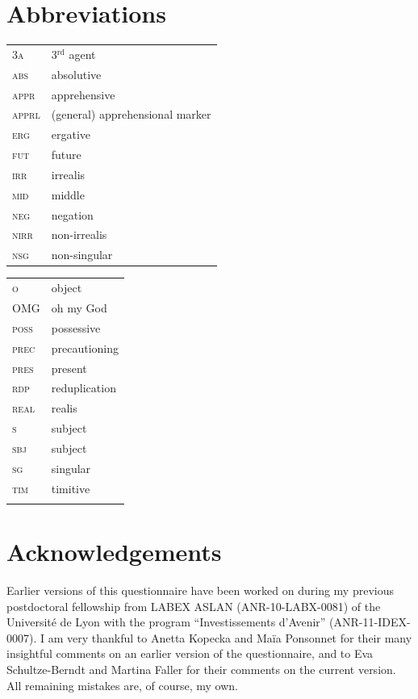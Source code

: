 \documentclass[output=paper,colorlinks,citecolor=brown]{langscibook}
\begin{document}
\section*{Abbreviations}
\begin{tabularx}{.5\textwidth}{@{}lQ@{}}
\textsc{3a} & 3$\mathrm{^{rd}}$ agent \\
\textsc{abs} & absolutive \\
\textsc{appr} & apprehensive \\
\textsc{apprl} & (general) apprehensional marker \\
\textsc{erg} & ergative \\
\textsc{fut} & future \\
\textsc{irr} & irrealis \\
\textsc{mid} & middle \\
\textsc{neg} & negation \\
\textsc{nirr} & non-irrealis \\
\textsc{nsg} & non-singular \end{tabularx}%
\begin{tabularx}{.5\textwidth}{@{}lQ@{}}
\textsc{o} & object \\
\textsc{OMG} & oh my God \\
\textsc{poss} & possessive \\
\textsc{prec} & precautioning \\
\textsc{pres} & present \\
\textsc{rdp} & reduplication \\
\textsc{real} & realis \\
\textsc{s} & subject \\
\textsc{sbj} & subject \\
\textsc{sg} & singular \\
\textsc{tim} & timitive \\\\
\end{tabularx}


\section*{Acknowledgements}
Earlier versions of this questionnaire have been worked on during my previous postdoctoral fellowship from LABEX ASLAN (ANR-10-LABX-0081) of the Université de Lyon with the program ``Investissements d'Avenir'' (ANR-11-IDEX-0007). I am very thankful  to Anetta Kopecka and Maïa Ponsonnet for their many insightful comments on an earlier version of the questionnaire, and to Eva Schultze-Berndt and Martina Faller for their comments on the current version. All remaining mistakes are, of course, my own.

\printbibliography[heading=subbibliography,notkeyword=this]
\end{document}
